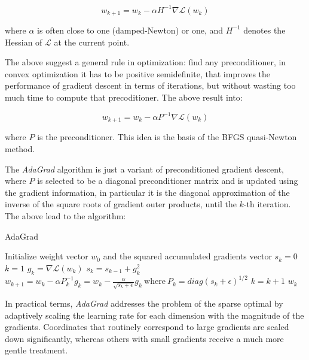 $$
w_{k+1} = w_k - \alpha H^{-1} \nabla \mathcal{L}(w_k)
$$

where $\alpha$ is often close to one (damped-Newton) or one, and $H^{-1}$ denotes the Hessian of $\mathcal{L}$ at the current point.

The above suggest a general rule in optimization: find any preconditioner, in convex optimization it has to be positive semidefinite, that improves the performance of gradient descent in terms of iterations, but without wasting too much time to compute that precoditioner. The above result into:

$$
w_{k+1} = w_k - \alpha P^{-1} \nabla \mathcal{L}(w_k)
$$

where $P$ is the preconditioner. This idea is the basis of the BFGS quasi-Newton method.

The \emph{AdaGrad} \cite{duchi2011adaptive} algorithm is just a variant of preconditioned gradient descent, where $P$ is selected to be a diagonal preconditioner matrix and is updated using the gradient information, in particular it is the diagonal approximation of the inverse of the square roots of gradient outer products, until the $k$-th iteration. The above lead to the algorithm:

\begin{algorithm}[H]
	\caption{AdaGrad}
	\label{alg:adagrad}
	\begin{algorithmic}
			\State Initialize weight vector $w_0$ and the squared accumulated gradients vector $s_k = 0$
			\State $k = 1$
				\State $g_k = \nabla \mathcal{L}(w_k)$
				\State $s_k = s_{k-1} + g_k^2$
				\State $w_{k+1} = w_k - \alpha P_k^{-1} g_k = w_k - \displaystyle \frac{\alpha}{\sqrt{s_k + \epsilon}} g_k \ \text{where} \ P_k = diag(s_k + \epsilon)^{1/2}$
				\State $k = k + 1$
			\EndWhile
			\State \Return $w_k$
		\EndFunction
	\end{algorithmic}
\end{algorithm}

In practical terms, \emph{AdaGrad} addresses the problem of the sparse optimal by adaptively scaling the learning rate for each dimension with the magnitude of the gradients. Coordinates that routinely correspond to large gradients are scaled down significantly, whereas others with small gradients receive a much more gentle treatment.


